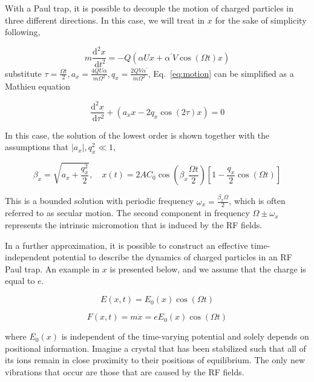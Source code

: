 With a Paul trap, it is possible to decouple the motion of charged particles in three different directions. In this case, we will treat in $x$ for the sake of simplicity following,

\begin{equation}\label{eq:motion}
    m \frac{\mathrm{d}^2 x}{\mathrm{~d} t^2}=-Q\left(\alpha U x+\alpha^{\prime} V \cos (\Omega t) x\right)
\end{equation}
substitute $\tau=\frac{\Omega t}{2}, a_x=\frac{4 Q U \alpha}{m \Omega^2}, q_x=\frac{2 Q V \alpha^{\prime}}{m \Omega^2}$, Eq.~\eqref{eq:motion} can be simplified as a Mathieu equation

\begin{equation}
    \frac{\mathrm{d}^2 x}{\mathrm{~d} \tau^2}+\left(a_x x-2 q_x \cos (2 \tau) x\right)=0
\end{equation}

In this case, the solution of the lowest order is shown together with the assumptions that $\left|a_x\right|, q_x^2 \ll 1$,

\begin{equation}
    \beta_x=\sqrt{a_x+\frac{q_x^2}{2}}, \quad x(t)=2 A C_0 \cos \left(\beta_x \frac{\Omega t}{2}\right)\left[1-\frac{q_x}{2} \cos (\Omega t)\right]
\end{equation}

This is a bounded solution with periodic frequency $\omega_x=\frac{\beta_x \Omega}{2}$, which is often referred to as secular motion. The second component in frequency $\Omega \pm \omega_x$ represents the intrinsic micromotion that is induced by the RF fields.

In a further approximation, it is possible to construct an effective time-independent potential to describe the dynamics of charged particles in an RF Paul trap. An example in $x$ is presented below, and we assume that the charge is equal to $e$.

\begin{equation}
    E(x, t)=E_0(x) \cos (\Omega t)
\end{equation}

\begin{equation}
    F(x, t)=m \ddot{x}=e E_0(x) \cos (\Omega t)
\end{equation}

where $E_0(x)$ is independent of the time-varying potential and solely depends on positional information. Imagine a crystal that has been stabilized such that all of its ions remain in close proximity to their positions of equilibrium. The only new vibrations that occur are those that are caused by the RF fields.

